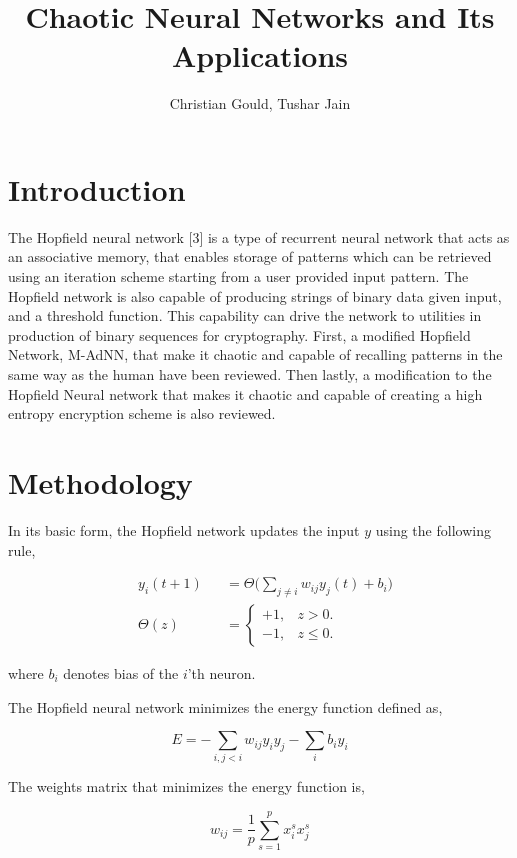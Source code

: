 \documentclass[12pt, letterpaper]{article}
\title{Chaotic Neural Networks and Its Applications}
\author{Christian Gould, Tushar Jain}
\date{}
\begin{document}
\maketitle

\thispagestyle{empty}
\clearpage
\setcounter{page}{1}
\newpage

\section*{Introduction}

The Hopfield neural network [3] is a type of recurrent neural network that acts as an associative memory, that enables storage of patterns which can be retrieved using an iteration scheme starting from a user provided input pattern. The Hopfield network is also capable of producing strings of binary data given input, and a threshold function. This capability can drive the network to utilities in production of binary sequences for cryptography. First, a modified Hopfield Network, M-AdNN, that make it chaotic and capable of recalling patterns in the same way as the human have been reviewed. Then lastly, a modification to the Hopfield Neural network that makes it chaotic and capable of creating a high entropy encryption scheme is also reviewed.

\section*{Methodology}

In its basic form, the Hopfield network updates the input $y$ using the following rule,

$$
\begin{aligned}
& y_i(t+1) &&= \Theta\big(\sum_{j \neq i} w_{ij}y_j(t) + b_i \big)\\
& \Theta(z) &&= \begin{cases}
  +1, & z > 0.\\
  -1, & z \le 0.
  \end{cases}
\end{aligned}
$$

where $b_i$ denotes bias of the $i$'th neuron.

The Hopfield neural network minimizes the energy function defined as,

$$
E = -\sum_{i,j < i} w_{ij}y_i y_j - \sum_{i} b_i y_i
$$

The weights matrix that minimizes the energy function is,

$$
w_{ij} = \frac{1}{p} \sum_{s=1}^p x_i^s x_j^s
$$
\end{document}
